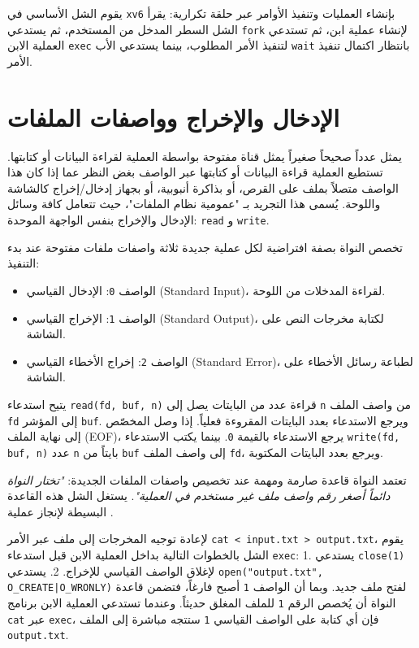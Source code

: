 يقوم الشل الأساسي في \texttt{xv6} بإنشاء العمليات وتنفيذ الأوامر عبر حلقة تكرارية:
يقرأ الشل السطر المدخل من المستخدم، ثم يستدعي \texttt{fork} لإنشاء عملية ابن،
ثم تستدعي العملية الابن \texttt{exec} لتنفيذ الأمر المطلوب، بينما يستدعي الأب \texttt{wait} بانتظار اكتمال تنفيذ الأمر.

\section{الإدخال والإخراج وواصفات الملفات}

يمثل  عدداً صحيحاً صغيراً يمثل قناة مفتوحة بواسطة العملية لقراءة البيانات أو كتابتها.
تستطيع العملية قراءة البيانات أو كتابتها عبر الواصف بغض النظر عما إذا كان هذا الواصف متصلاً بملف على القرص، أو بذاكرة أنبوبية، أو بجهاز إدخال/إخراج كالشاشة واللوحة.
يُسمى هذا التجريد بـ "عمومية نظام الملفات"، حيث تتعامل كافة وسائل الإدخال والإخراج بنفس الواجهة الموحدة: \texttt{read} و \texttt{write}.

تخصص النواة بصفة افتراضية لكل عملية جديدة ثلاثة واصفات ملفات مفتوحة عند بدء التنفيذ:
\begin{itemize}
\item الواصف \texttt{0}: الإدخال القياسي (Standard Input)، لقراءة المدخلات من اللوحة.
\item الواصف \texttt{1}: الإخراج القياسي (Standard Output)، لكتابة مخرجات النص على الشاشة.
\item الواصف \texttt{2}: إخراج الأخطاء القياسي (Standard Error)، لطباعة رسائل الأخطاء على الشاشة.
\end{itemize}

يتيح استدعاء \texttt{read(fd, buf, n)} قراءة عدد من البايتات يصل إلى \texttt{n} من واصف الملف \texttt{fd} إلى المؤشر \texttt{buf}.
ويرجع الاستدعاء بعدد البايتات المقروءة فعلياً. إذا وصل المخصّص إلى نهاية الملف (EOF)، يرجع الاستدعاء بالقيمة \texttt{0}.
بينما يكتب الاستدعاء \texttt{write(fd, buf, n)} عدد \texttt{n} بايتاً من \texttt{buf} إلى واصف الملف \texttt{fd}، ويرجع بعدد البايتات المكتوبة.

تعتمد النواة قاعدة صارمة ومهمة عند تخصيص واصفات الملفات الجديدة:
\textit{"تختار النواة دائماً أصغر رقم واصف ملف غير مستخدم في العملية"}.
يستغل الشل هذه القاعدة البسيطة لإنجاز عملية .

لإعادة توجيه المخرجات إلى ملف عبر الأمر \texttt{cat < input.txt > output.txt}، يقوم الشل بالخطوات التالية بداخل العملية الابن قبل استدعاء \texttt{exec}:
1. يستدعي \texttt{close(1)} لإغلاق الواصف القياسي للإخراج.
2. يستدعي \texttt{open("output.txt", O_CREATE|O_WRONLY)} لفتح ملف جديد.
وبما أن الواصف \texttt{1} أصبح فارغاً، فتضمن قاعدة النواة أن يُخصص الرقم \texttt{1} للملف المغلق حديثاً.
وعندما تستدعي العملية الابن برنامج \texttt{cat} عبر \texttt{exec}، فإن أي كتابة على الواصف القياسي \texttt{1} ستتجه مباشرة إلى الملف \texttt{output.txt}.

